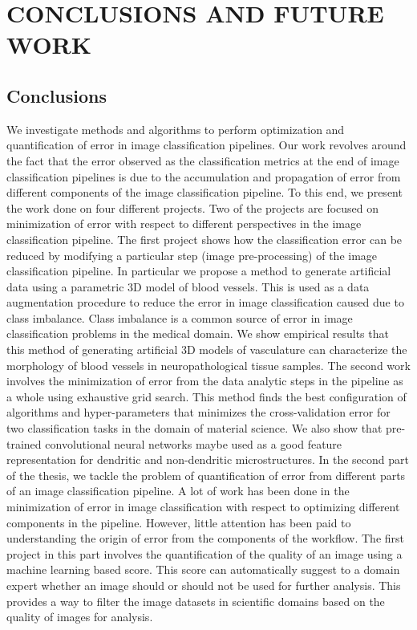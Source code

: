 \chapter{CONCLUSIONS AND FUTURE WORK}
\label{chap:conclusions}
\section{Conclusions}
We investigate methods and algorithms to perform optimization and quantification of error in image classification pipelines. Our work revolves around the fact that the error observed as the classification metrics at the end of image classification pipelines is due to the accumulation and propagation of error from different components of the image classification pipeline. To this end, we present the work done on four different projects. Two of the projects are focused on minimization of error with respect to different perspectives in the image classification pipeline. 
The first project shows how the classification error can be reduced by modifying a particular step (image pre-processing) of the image classification pipeline. In particular we propose a method to generate artificial data using a parametric 3D model of blood vessels. This is used as a data augmentation procedure to reduce the error in image classification caused due to class imbalance. Class imbalance is a common source of error in image classification problems in the medical domain. We show empirical results that this method of generating artificial 3D models of vasculature can characterize the morphology of blood vessels in neuropathological tissue samples.  
The second work involves the minimization of error from the data analytic steps in the pipeline as a whole using exhaustive grid search. This method finds the best configuration of algorithms and hyper-parameters that minimizes the cross-validation error for two classification tasks in the domain of material science. We also show that pre-trained convolutional neural networks maybe used  as a good feature representation for dendritic and non-dendritic microstructures. 
In the second part of the thesis, we tackle the problem of quantification of error from different parts of an image classification pipeline. A lot of work has been done in the minimization of error in image classification with respect to optimizing different components in the pipeline. However, little attention has been paid to understanding the origin of error from the components of the workflow. 
The first project in this part involves the quantification of the quality of an image using a machine learning based score. This score can automatically suggest to a domain expert whether an image should or should not be used for further analysis. This provides a way to filter the image datasets in scientific domains based on the quality of images for analysis.
